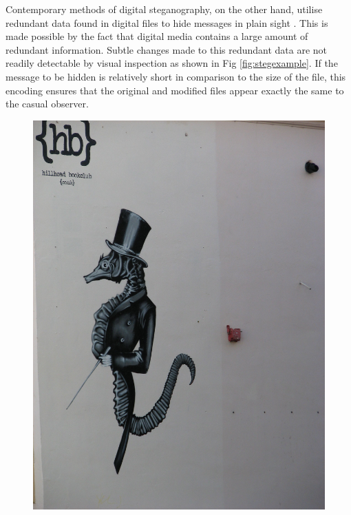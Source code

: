\documentclass[12pt]{extreport}
\begin{document}
Contemporary methods of digital steganography, on the other hand, utilise redundant data found in digital files to hide messages in plain sight  \cite{hinson2009introduction}.  This is made possible by the fact that digital media contains a large amount of redundant information. Subtle changes made to this redundant data are not readily detectable by visual inspection as shown in Fig \ref{fig:stegexample}.  If the message to be hidden is relatively short in comparison to the size of the file, this encoding ensures that the original and modified files appear exactly the same to the casual observer.
\begin{figure}[h!]
\includegraphics[scale=0.10]{hb1}

\end{figure}
\end{document}
